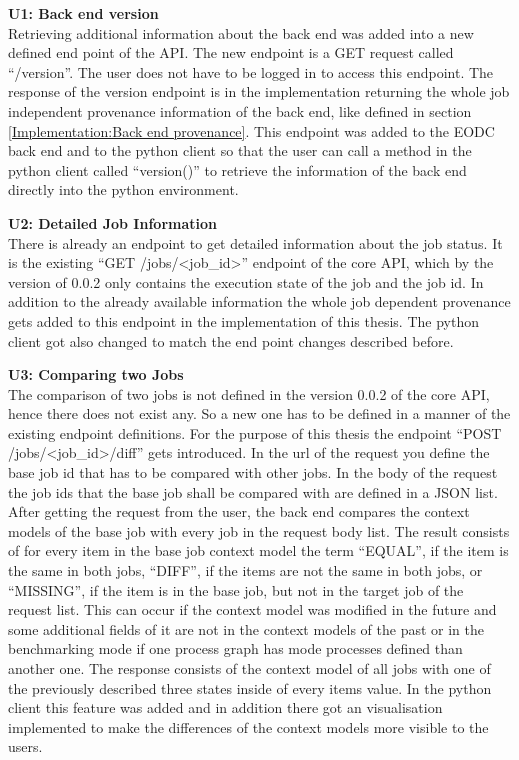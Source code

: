 \documentclass[draft,final]{vutinfth} %
\begin{document}
\textbf{U1: Back end version} \\
Retrieving additional information about the back end was added into a new defined end point of the API. The new endpoint is a GET request called “/version”. The user does not have to be logged in to access this endpoint. The response of the version endpoint is in the implementation returning the whole job independent provenance information of the back end, like defined in section \ref{Implementation:Back end provenance}. This endpoint was added to the EODC back end and to the python client so that the user can call a method in the python client called “version()” to retrieve the information of the back end directly into the python environment. 

\textbf{U2: Detailed Job Information} \\
There is already an endpoint to get detailed information about the job status. It is the existing “GET /jobs/<job\_id>” endpoint of the core API, which by the version of 0.0.2 only contains the execution state of the job and the job id. In addition to the already available information the whole job dependent provenance gets added to this endpoint in the implementation of this thesis. The python client got also changed to match the end point changes described before.  

\textbf{U3: Comparing two Jobs} \\
The comparison of two jobs is not defined in the version 0.0.2 of the core API, hence there does not exist any. So a new one has to be defined in a manner of the existing endpoint definitions. For the purpose of this thesis the endpoint  “POST /jobs/<job\_id>/diff” gets introduced. In the url of the request you define the base job id that has to be compared with other jobs. In the body of the request the job ids that the base job shall be compared with are defined in a JSON list. After getting the request from the user, the back end compares the context models of the base job with every job in the request body list. The result consists of for every item in the base job context model the term “EQUAL”, if the item is the same in both jobs, “DIFF”, if the items are not the same in both jobs, or “MISSING”, if the item is in the base job, but not in the target job of the request list. This can occur if the context model was modified in the future and some additional fields of it are not in the context models of the past or in the benchmarking mode if one process graph has mode processes defined than another one. The response consists of the context model of all jobs with one of the previously described three states inside of every items value. In the python client this feature was added and in addition there got an visualisation implemented to make the differences of the context models more visible to the users.
\end{document}
